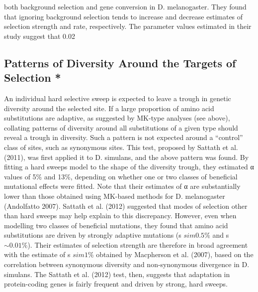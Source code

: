 both background selection and gene conversion in D. melanogaster. They found that ignoring background selection tends to increase and decrease estimates of selection strength and rate, respectively. The parameter values estimated in their study suggest that 0.02%
 
\subsection[Patterns of Diversity Around the Targets of Selection]{Patterns of Diversity Around the Targets of Selection *}
 
An individual hard selective sweep is expected to leave a trough in genetic diversity around the selected site. If a large proportion of amino acid substitutions are adaptive, as suggested by MK-type analyses (see above), collating patterns of diversity around all substitutions of a given type should reveal a trough in diversity. Such a pattern is not expected around a “control” class of sites, such as synonymous sites. This test, proposed by Sattath et al. (2011), was first applied it to D. simulans, and the above pattern was found. By fitting a hard sweeps model to the shape of the diversity trough, they estimated α values of  5\% and 13\%, depending on whether one or two classes of beneficial mutational effects were fitted. Note that their estimates of α are substantially lower than those obtained using MK-based methods for D. melanogaster (Andolfatto 2007). Sattath et al. (2012) suggested that modes of selection other than hard sweeps may help explain to this discrepancy. However, even when modelling two classes of beneficial mutations, they found that amino acid substitutions are driven by strongly adaptive mutations (s $sim0.5\%$ and s $\sim0.01\%$). Their estimates of selection strength are therefore in broad agreement with the estimate of s $sim1\%$ obtained by Macpherson et al. (2007), based on the correlation between synonymous diversity and non-synonymous divergence in D. simulans. The Sattath et al. (2012) test, then, suggests that adaptation in protein-coding genes is fairly frequent and driven by strong, hard sweeps.
 
